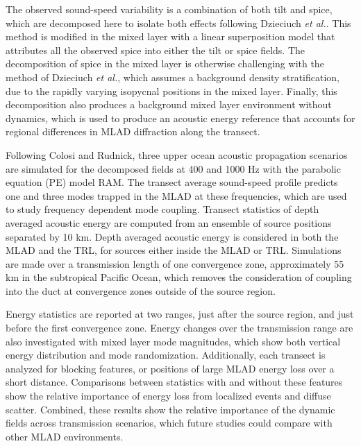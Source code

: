 \documentclass[preprint,NumberedRefs]{JASA}
\begin{document}
The observed sound-speed variability is a combination of both tilt and spice, which are decomposed here to isolate both effects following Dzieciuch \emph{et al.}.\citep{dzieciuch2004} This method is modified in the mixed layer with a linear superposition model that attributes all the observed spice into either the tilt or spice fields. The decomposition of spice in the mixed layer is otherwise challenging with the method of Dzieciuch \emph{et al.},\cite{dzieciuch2004} which assumes a background density stratification, due to the rapidly varying isopycnal positions in the mixed layer. Finally, this decomposition also produces a background mixed layer environment without dynamics, which is used to produce an acoustic energy reference that accounts for regional differences in MLAD diffraction along the transect.

Following Colosi and Rudnick,\cite{colosi2020observations} three upper ocean acoustic propagation scenarios are simulated for the decomposed fields at 400 and 1000 Hz with the parabolic equation (PE) model RAM\cite{collins93}. The transect average sound-speed profile predicts one and three modes trapped in the MLAD at these frequencies, which are used to study frequency dependent mode coupling. Transect statistics of depth averaged acoustic energy are computed from an ensemble of source positions separated by 10 km. Depth averaged acoustic energy is considered in both the MLAD and the TRL, for sources either inside the MLAD or TRL. Simulations are made over a transmission length of one convergence zone,\citep{jensen2011computational} approximately 55 km in the subtropical Pacific Ocean, which removes the consideration of coupling into the duct at convergence zones outside of the source region.\citep{colosi2020observations}

Energy statistics are reported at two ranges, just after the source region, and just before the first convergence zone. Energy changes over the transmission range are also investigated with mixed layer mode magnitudes, which show both vertical energy distribution and mode randomization. Additionally, each transect is analyzed for blocking features,\citep{colosi2020observations} or positions of large MLAD energy loss over a short distance. Comparisons between statistics with and without these features show the relative importance of energy loss from localized events and diffuse scatter. Combined, these results show the relative importance of the dynamic fields across transmission scenarios, which future studies could compare with other MLAD environments.
\end{document}
